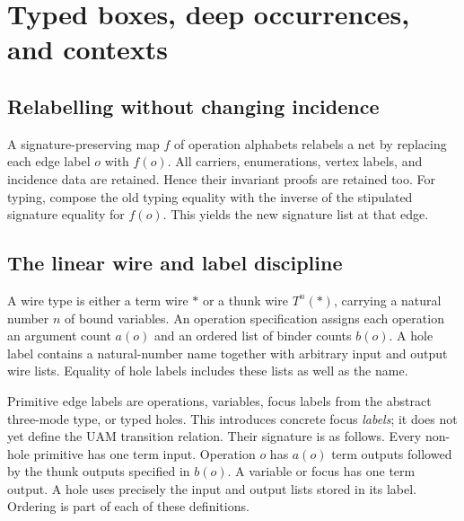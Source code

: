 \section{Typed boxes, deep occurrences, and contexts}
\subsection{Relabelling without changing incidence}
A signature-preserving map $f$ of operation alphabets relabels a net by replacing
each edge label $o$ with $f(o)$. All carriers, enumerations, vertex labels, and
incidence data are retained. Hence their invariant proofs are retained too.
For typing, compose the old typing equality with the inverse of the stipulated
signature equality for $f(o)$. This yields the new signature list at that edge.

\subsection{The linear wire and label discipline}
\begin{definition}\label{term:wire}
A wire type is either a term wire $*$ or a thunk wire $T^n(*)$, carrying a natural
number $n$ of bound variables. An operation specification assigns each operation
an argument count $a(o)$ and an ordered list of binder counts $b(o)$. A hole label
contains a natural-number name together with arbitrary input and output wire lists.
Equality of hole labels includes these lists as well as the name.
\end{definition}
Primitive edge labels are operations, variables, focus labels from the abstract
three-mode type, or typed holes. This introduces concrete focus \emph{labels};
it does not yet define the UAM transition relation.
Their signature is as follows. Every non-hole primitive has one term input.
Operation $o$ has $a(o)$ term outputs followed by the thunk outputs specified in
$b(o)$. A variable or focus has one term output. A hole uses precisely the input
and output lists stored in its label. Ordering is part of each of these definitions.


